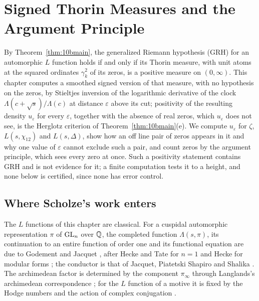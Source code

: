 \chapter[Signed Thorin Measures]{Signed Thorin Measures and the Argument Principle}\label{ch:scholze}

By Theorem~\ref{thm:10bmain}, the generalized Riemann hypothesis (GRH) for an automorphic $L$ function holds if and only if its Thorin measure, with unit atoms at the squared ordinates $\gamma_k^2$ of its zeros, is a positive measure on $(0,\infty)$. This chapter computes a smoothed signed version of that measure, with no hypothesis on the zeros, by Stieltjes inversion of the logarithmic derivative of the clock $\Lambda(c+\sqrt s)/\Lambda(c)$ at distance $\varepsilon$ above its cut; positivity of the resulting density $u_\varepsilon$ for every $\varepsilon$, together with the absence of real zeros, which $u_\varepsilon$ does not see, is the Herglotz criterion of Theorem~\ref{thm:10bmain}(e). We compute $u_\varepsilon$ for $\zeta$, $L(s,\chi_{12})$ and $L(s,\Delta)$, show how an off line pair of zeros appears in it and why one value of $\varepsilon$ cannot exclude such a pair, and count zeros by the argument principle, which sees every zero at once. Such a positivity statement contains GRH and is not evidence for it; a finite computation tests it to a height, and none below is certified, since none has error control.

\section{Where Scholze's work enters}\label{sec:scholzegalois}

The $L$ functions of this chapter are classical. For a cuspidal automorphic representation $\pi$ of $\mathrm{GL}_n$ over $\mathbb{Q}$, the completed function $\Lambda(s,\pi)$, its continuation to an entire function of order one and its functional equation are due to Godement and Jacquet \cite{godementjacquet1972}, after Hecke and Tate for $n=1$ \cite{hecke1918,tate1967} and Hecke for modular forms \cite{hecke1936,hecke1937}; the conductor is that of Jacquet, Piatetski Shapiro and Shalika \cite{jpss1981}. The archimedean factor is determined by the component $\pi_\infty$ through Langlands's archimedean correspondence \cite{langlands1989,knapp1994}; for the $L$ function of a motive it is fixed by the Hodge numbers and the action of complex conjugation \cite{serre1970}.

